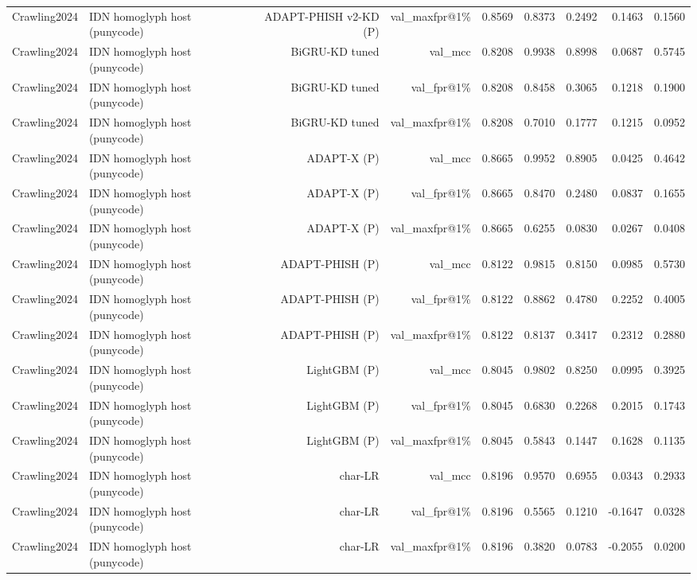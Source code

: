 \begin{table}[t]
\begin{tabular}{llrrrrrrr}
Crawling2024 & IDN homoglyph host (punycode) & ADAPT-PHISH v2-KD (P) & val\_maxfpr@1\% & 0.8569 & 0.8373 & 0.2492 & 0.1463 & 0.1560 \\
Crawling2024 & IDN homoglyph host (punycode) & BiGRU-KD tuned & val\_mcc & 0.8208 & 0.9938 & 0.8998 & 0.0687 & 0.5745 \\
Crawling2024 & IDN homoglyph host (punycode) & BiGRU-KD tuned & val\_fpr@1\% & 0.8208 & 0.8458 & 0.3065 & 0.1218 & 0.1900 \\
Crawling2024 & IDN homoglyph host (punycode) & BiGRU-KD tuned & val\_maxfpr@1\% & 0.8208 & 0.7010 & 0.1777 & 0.1215 & 0.0952 \\
Crawling2024 & IDN homoglyph host (punycode) & ADAPT-X (P) & val\_mcc & 0.8665 & 0.9952 & 0.8905 & 0.0425 & 0.4642 \\
Crawling2024 & IDN homoglyph host (punycode) & ADAPT-X (P) & val\_fpr@1\% & 0.8665 & 0.8470 & 0.2480 & 0.0837 & 0.1655 \\
Crawling2024 & IDN homoglyph host (punycode) & ADAPT-X (P) & val\_maxfpr@1\% & 0.8665 & 0.6255 & 0.0830 & 0.0267 & 0.0408 \\
Crawling2024 & IDN homoglyph host (punycode) & ADAPT-PHISH (P) & val\_mcc & 0.8122 & 0.9815 & 0.8150 & 0.0985 & 0.5730 \\
Crawling2024 & IDN homoglyph host (punycode) & ADAPT-PHISH (P) & val\_fpr@1\% & 0.8122 & 0.8862 & 0.4780 & 0.2252 & 0.4005 \\
Crawling2024 & IDN homoglyph host (punycode) & ADAPT-PHISH (P) & val\_maxfpr@1\% & 0.8122 & 0.8137 & 0.3417 & 0.2312 & 0.2880 \\
Crawling2024 & IDN homoglyph host (punycode) & LightGBM (P) & val\_mcc & 0.8045 & 0.9802 & 0.8250 & 0.0995 & 0.3925 \\
Crawling2024 & IDN homoglyph host (punycode) & LightGBM (P) & val\_fpr@1\% & 0.8045 & 0.6830 & 0.2268 & 0.2015 & 0.1743 \\
Crawling2024 & IDN homoglyph host (punycode) & LightGBM (P) & val\_maxfpr@1\% & 0.8045 & 0.5843 & 0.1447 & 0.1628 & 0.1135 \\
Crawling2024 & IDN homoglyph host (punycode) & char-LR & val\_mcc & 0.8196 & 0.9570 & 0.6955 & 0.0343 & 0.2933 \\
Crawling2024 & IDN homoglyph host (punycode) & char-LR & val\_fpr@1\% & 0.8196 & 0.5565 & 0.1210 & -0.1647 & 0.0328 \\
Crawling2024 & IDN homoglyph host (punycode) & char-LR & val\_maxfpr@1\% & 0.8196 & 0.3820 & 0.0783 & -0.2055 & 0.0200 \\

\end{tabular}
\end{table}

